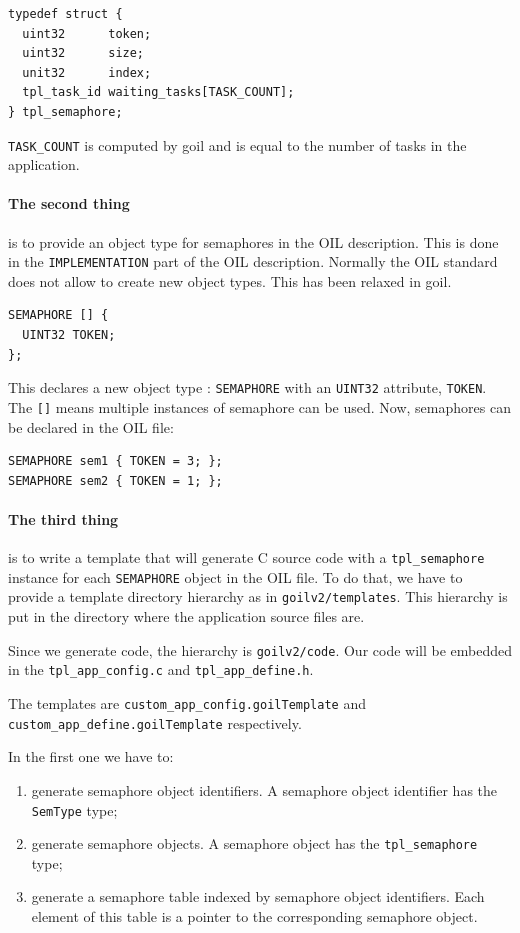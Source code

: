\documentclass[11pt]{article}
\begin{document}
\begin{lstlisting}
typedef struct {
  uint32      token;
  uint32      size;
  unit32      index;
  tpl_task_id waiting_tasks[TASK_COUNT];
} tpl_semaphore;
\end{lstlisting}

\lstinline{TASK_COUNT} is computed by goil and is equal to the number of tasks in the application. 

\paragraph{The second thing} is to provide an object type for semaphores in the OIL description. This is done in the \lstinline{IMPLEMENTATION} part of the OIL description. Normally the OIL standard does not allow to create new object types. This has been relaxed in goil.

\begin{lstlisting}
SEMAPHORE [] {
  UINT32 TOKEN;
};
\end{lstlisting}

This declares a new object type : \lstinline{SEMAPHORE} with an \lstinline{UINT32} attribute, \lstinline{TOKEN}. The \lstinline{[]} means multiple instances of semaphore can be used.
Now, semaphores can be declared in the OIL file:

\begin{lstlisting}
SEMAPHORE sem1 { TOKEN = 3; };
SEMAPHORE sem2 { TOKEN = 1; };
\end{lstlisting}

\paragraph{The third thing} is to write a template that will generate C source code with a \lstinline{tpl_semaphore} instance for each \lstinline{SEMAPHORE} object in the OIL file. To do that, we have to provide a template directory hierarchy as in \lstinline{goilv2/templates}. This hierarchy is put in the directory where the application source files are.

Since we generate code, the hierarchy is \lstinline{goilv2/code}. Our code  will be embedded in the \lstinline{tpl_app_config.c} and \lstinline{tpl_app_define.h}.

The templates are \lstinline{custom_app_config.goilTemplate} and \lstinline{custom_app_define.goilTemplate} respectively.

In the first one we have to:
\begin{enumerate}
\item generate semaphore object identifiers. A semaphore object identifier has the \lstinline{SemType} type;
\item generate semaphore objects. A semaphore object has the \lstinline{tpl_semaphore} type;
\item generate a semaphore table indexed by semaphore object identifiers. Each element of this table is a pointer to the corresponding semaphore object.
\end{enumerate}
\end{document}
